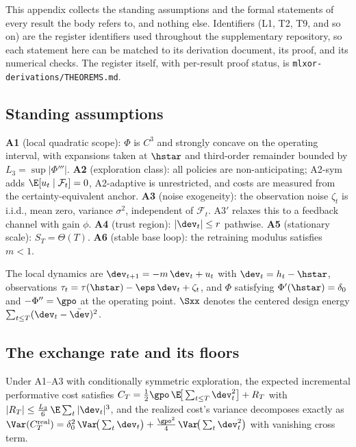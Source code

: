 
This appendix collects the standing assumptions and the formal statements of
every result the body refers to, and nothing else. Identifiers (L1, T2, T9,
and so on) are the register identifiers used throughout the supplementary
repository, so each statement here can be matched to its derivation
document, its proof, and its numerical checks. The register itself, with
per-result proof status, is \texttt{mlxor-derivations/THEOREMS.md}.

\subsection{Standing assumptions}

\textbf{A1} (local quadratic scope): $\Phi$ is $C^3$ and strongly concave on
the operating interval, with expansions taken at $\hstar$ and third-order
remainder bounded by $L_3 = \sup|\Phi'''|$.
\textbf{A2} (exploration class): all policies are non-anticipating; A2-sym
adds $\E[u_t \mid \mathcal{F}_t] = 0$, A2-adaptive is
unrestricted, and costs are measured from the certainty-equivalent anchor.
\textbf{A3} (noise exogeneity): the observation noise $\zeta_t$ is i.i.d.,
mean zero, variance $\sigma^2$, independent of $\mathcal{F}_t$. A3$'$ relaxes
this to a feedback channel with gain $\phi$.
\textbf{A4} (trust region): $|\dev_t| \le r$ pathwise.
\textbf{A5} (stationary scale): $S_T = \Theta(T)$.
\textbf{A6} (stable base loop): the retraining modulus satisfies $m < 1$.

The local dynamics are $\dev_{t+1} = -m\,\dev_t + u_t$ with
$\dev_t = h_t - \hstar$, observations
$\tau_t = \tau(\hstar) - \eps\,\dev_t + \zeta_t$, and $\Phi$ satisfying
$\Phi'(\hstar) = \delta_0$ and $-\Phi'' = \gpo$ at the operating point.
$\Sxx$ denotes the centered design energy $\sum_{t\le T}(\dev_t -
\bar\dev)^2$.

\subsection{The exchange rate and its floors}

\begin{lemma}
\label{lem:cost}
Under A1--A3 with conditionally symmetric exploration, the expected
incremental performative cost satisfies
$C_T = \tfrac{1}{2}\gpo\,\E\!\big[\sum_{t\le T}\dev_t^2\big] + R_T$ with
$|R_T| \le \tfrac{L_3}{6}\,\E\sum_t |\dev_t|^3$, and the realized cost's
variance decomposes exactly as
$\Var(C_T^{\mathrm{real}}) = \delta_0^2\,\Var\!\big(\sum_t \dev_t\big)
+ \tfrac{\gpo^2}{4}\,\Var\!\big(\sum_t \dev_t^2\big)$
with vanishing cross term.
\end{lemma}

